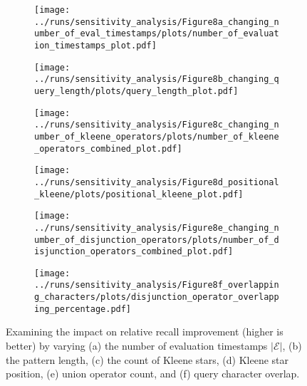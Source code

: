 \begin{figure*}[t]
	\centering
	

	\begin{subfigure}{.38\linewidth}
		\centering
		\texttt{[image: ../runs/sensitivity\_analysis/Figure8a\_changing\_number\_of\_eval\_timestamps/plots/number\_of\_evaluation\_timestamps\_plot.pdf]}
		\vspace{-18pt}
		\caption{}
		\label{plot:evaluation_timestamps}
	\end{subfigure}
	\hfill
	\begin{subfigure}{.38\linewidth}
		\centering
		\texttt{[image: ../runs/sensitivity\_analysis/Figure8b\_changing\_query\_length/plots/query\_length\_plot.pdf]}
		\vspace{-18pt}
		\caption{}
		\label{plot:query_length}
	\end{subfigure}
    
    \vspace{1em} 
	\begin{subfigure}{.38\linewidth}
		\centering
		\texttt{[image: ../runs/sensitivity\_analysis/Figure8c\_changing\_number\_of\_kleene\_operators/plots/number\_of\_kleene\_operators\_combined\_plot.pdf]}
		\vspace{-18pt}
		\caption{}
		\label{plot:number_of_kleenes}
	\end{subfigure}
	\hfill
	\begin{subfigure}{.38\linewidth}
		\centering
		\texttt{[image: ../runs/sensitivity\_analysis/Figure8d\_positional\_kleene/plots/positional\_kleene\_plot.pdf]}
		\vspace{-18pt}
		\caption{}
		\label{plot:positional_kleene}
	\end{subfigure}

	\vspace{1em} 
	\begin{subfigure}{.38\linewidth}
		\centering
		\texttt{[image: ../runs/sensitivity\_analysis/Figure8e\_changing\_number\_of\_disjunction\_operators/plots/number\_of\_disjunction\_operators\_combined\_plot.pdf]}
		\vspace{-18pt}
		\caption{}
		\label{plot:number_of_unions}
	\end{subfigure}
	\hfill
	\begin{subfigure}{.38\linewidth}
		\centering
		\texttt{[image: ../runs/sensitivity\_analysis/Figure8f\_overlapping\_characters/plots/disjunction\_operator\_overlapping\_percentage.pdf]}
		\vspace{-18pt}
		\caption{}
		\label{plot:query_character_overlap}
	\end{subfigure}

	\vspace{-1em}
	\caption{Examining the impact on relative recall improvement (higher is better) by varying (a) the number of evaluation timestamps $|\mathcal{E}|$, (b) the pattern length, (c) the count of Kleene stars, (d) Kleene star position, (e) union operator count, and (f) query character overlap.}
	\label{fig:operator_analysis}
	\vspace{-1em}
\end{figure*}


